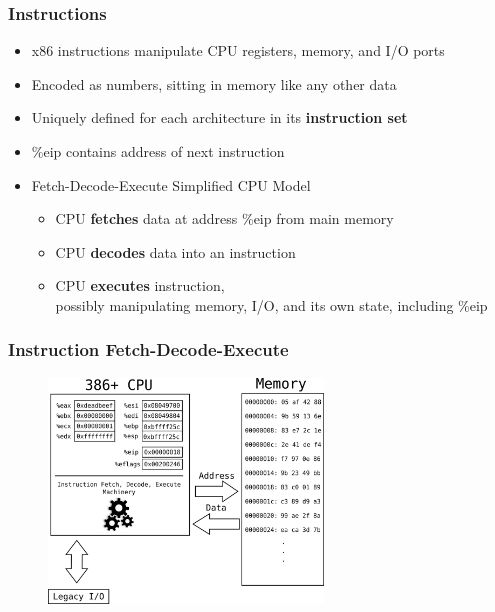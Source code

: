 \documentclass[11pt,xcolor=dvipsnames]{beamer}
\newcommand{\vs}{\vspace{0.5em}}
\newcommand{\mvs}{\vspace{-0.95em}}
\begin{document}
\begin{frame}[fragile,t]
\frametitle{Instructions}
\begin{itemize}
    \item x86 instructions manipulate CPU registers, memory, and I/O ports
    \item Encoded as numbers, sitting in memory like any other data
    \item Uniquely defined for each architecture in its {\bf instruction set}
    \item {\ttfamily \%eip} contains address of next instruction
    \vs \vs \vs
    \pause
    \item Fetch-Decode-Execute Simplified CPU Model
    \begin{itemize}
        \item CPU {\bf fetches} data at address {\ttfamily \%eip} from main memory \\
        \item CPU {\bf decodes} data into an instruction \\
        \item CPU {\bf executes} instruction, \\ possibly manipulating memory, I/O, and its own state, including {\ttfamily \%eip}
    \end{itemize}
\end{itemize}
\end{frame}

\begin{frame}[fragile,t]
\frametitle{Instruction Fetch-Decode-Execute}
\mvs
\begin{figure}
\centering \includegraphics[width=0.65\textwidth]{figures/386fetch_decode_execute0.png}
\end{figure}
\end{frame}
\end{document}
